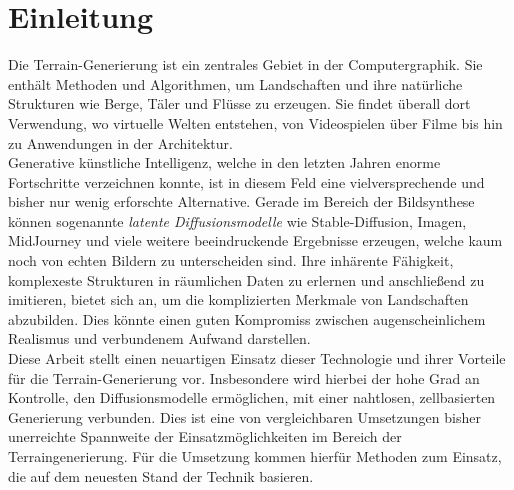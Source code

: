 \chapter{Einleitung}



Die Terrain-Generierung ist ein zentrales Gebiet in der Computergraphik. Sie enthält Methoden und Algorithmen, um Landschaften und ihre natürliche Strukturen wie Berge, Täler und Flüsse zu erzeugen. Sie findet überall dort Verwendung, wo virtuelle Welten entstehen, von Videospielen über Filme bis hin zu Anwendungen in der Architektur. \\
Generative künstliche Intelligenz, welche in den letzten Jahren enorme Fortschritte verzeichnen konnte, ist in diesem Feld eine vielversprechende und bisher nur wenig erforschte Alternative. Gerade im Bereich der Bildsynthese können sogenannte \textit{latente Diffusionsmodelle} wie Stable-Diffusion, Imagen, MidJourney und viele weitere beeindruckende Ergebnisse erzeugen, welche kaum noch von echten Bildern zu unterscheiden sind.
Ihre inhärente Fähigkeit, komplexeste Strukturen in räumlichen Daten zu erlernen und anschließend zu imitieren, bietet sich an, um die komplizierten Merkmale von Landschaften abzubilden. Dies könnte einen guten Kompromiss zwischen augenscheinlichem Realismus und verbundenem Aufwand darstellen. \\
Diese Arbeit stellt einen neuartigen Einsatz dieser Technologie und ihrer Vorteile für die Terrain-Generierung vor. Insbesondere wird hierbei der hohe Grad an Kontrolle, den Diffusionsmodelle ermöglichen, mit einer nahtlosen, zellbasierten Generierung verbunden. Dies ist eine von vergleichbaren Umsetzungen bisher unerreichte Spannweite der Einsatzmöglichkeiten im Bereich der Terraingenerierung. Für die Umsetzung kommen hierfür Methoden zum Einsatz, die auf dem neuesten Stand der Technik basieren.
 
